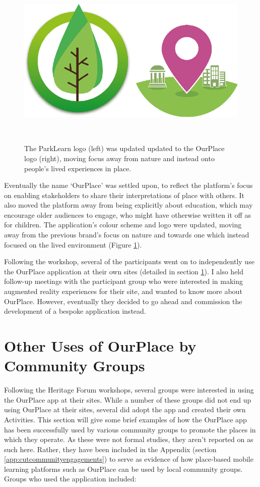 \begin{figure}
  \centering
  \includegraphics[width=0.8\columnwidth]{images/chapter06/logos.png}
  \caption[The ParkLearn and OurPlace Logos]{The ParkLearn logo (left) was updated updated to the OurPlace logo (right), moving focus away from nature and instead onto people's lived experiences in place.}~\label{fig:AppLogos}
\end{figure}

Eventually the name `OurPlace' was settled upon, to reflect the platform's focus on enabling stakeholders to share their interpretations of place with others. It also moved the platform away from being explicitly about education, which may encourage older audiences to engage, who might have otherwise written it off as for children. The application's colour scheme and logo were updated, moving away from the previous brand's focus on nature and towards one which instead focused on the lived environment (Figure \ref{fig:AppLogos}).

Following the workshop, several of the participants went on to independently use the OurPlace application at their own sites (detailed in section \ref{sec:CommunityGroups}). I also held follow-up meetings with the participant group who were interested in making augmented reality experiences for their site, and wanted to know more about OurPlace. However, eventually they decided to go ahead and commission the development of a bespoke application instead.

\section{Other Uses of OurPlace by Community Groups}
\label{sec:CommunityGroups}

Following the Heritage Forum workshops, several groups were interested in using the OurPlace app at their sites. While a number of these groups did not end up using OurPlace at their sites, several did adopt the app and created their own Activities. This section will give some brief examples of how the OurPlace app has been successfully used by various community groups to promote the places in which they operate. As these were not formal studies, they aren't reported on as such here. Rather, they have been included in the Appendix (section \ref{app:cutcommunityengagements}) to serve as evidence of how place-based mobile learning platforms such as OurPlace can be used by local community groups. Groups who used the application included:

